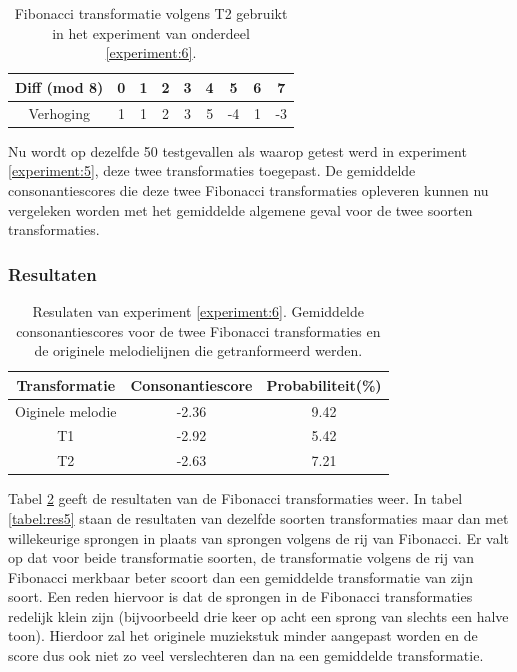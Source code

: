 \begin{table}
  \centering
  \begin{tabular}{c | c c c c c c c c }
    Diff (mod 8) & 0 & 1 & 2 & 3 & 4 & 5 & 6 & 7 \\
    \hline
    \hline
    Verhoging & 1 & 1 & 2 & 3 & 5 & -4 & 1 & -3 \\
  \end{tabular}
  \caption{Fibonacci transformatie volgens T2 gebruikt in het experiment van onderdeel \ref{experiment:6}.}
  \label{tabel:exp6:T2}
\end{table}

Nu wordt op dezelfde 50 testgevallen als waarop getest werd in experiment \ref{experiment:5}, deze twee transformaties toegepast. De gemiddelde consonantiescores die deze twee Fibonacci transformaties opleveren kunnen nu vergeleken worden met het gemiddelde algemene geval voor de twee soorten transformaties. 

\subsubsection{Resultaten}

\begin{table}
  \centering
  \begin{tabular}{c | c c }    
    Transformatie & Consonantiescore & Probabiliteit(\%)\\
    \hline
    Oiginele melodie & -2.36 & 9.42\\
    T1 & -2.92 & 5.42\\
    T2 & -2.63 & 7.21\\
  \end{tabular}
  \caption{Resulaten van experiment \ref{experiment:6}. Gemiddelde consonantiescores voor de twee Fibonacci transformaties en de originele melodielijnen die getranformeerd werden.}
  \label{tabel:res6}
\end{table}

Tabel \ref{tabel:res6} geeft de resultaten van de Fibonacci transformaties weer. In tabel \ref{tabel:res5} staan de resultaten van dezelfde soorten transformaties maar dan met willekeurige sprongen in plaats van sprongen volgens de rij van Fibonacci. Er valt op dat voor beide transformatie soorten, de transformatie volgens de rij van Fibonacci merkbaar beter scoort dan een gemiddelde transformatie van zijn soort. Een reden hiervoor is dat de sprongen in de Fibonacci transformaties redelijk klein zijn (bijvoorbeeld drie keer op acht een sprong van slechts een halve toon). Hierdoor zal het originele muziekstuk minder aangepast worden en de score dus ook niet zo veel verslechteren dan na een gemiddelde transformatie. 


